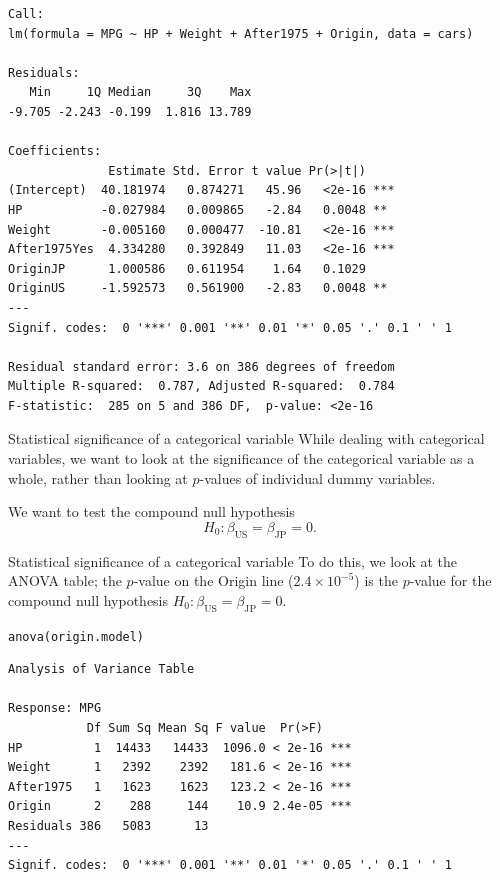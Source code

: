 \documentclass{beamer}\usepackage[]{graphicx}\usepackage[]{color}
\makeatletter
\newcommand{\hlstd}[1]{\textcolor[rgb]{1,0.894,0.769}{#1}}%
\newcommand{\hlkwd}[1]{\textcolor[rgb]{1,0.78,0.769}{#1}}%
\newenvironment{kframe}{%
 \def\at@end@of@kframe{}%
 \ifinner\ifhmode%
  \def\at@end@of@kframe{\end{minipage}}%
  \begin{minipage}{\columnwidth}%
 \fi\fi%
 \def\FrameCommand##1{\hskip\@totalleftmargin \hskip-\fboxsep
 \colorbox{shadecolor}{##1}\hskip-\fboxsep
     \hskip-\linewidth \hskip-\@totalleftmargin \hskip\columnwidth}%
 \MakeFramed {\advance\hsize-\width
   \@totalleftmargin\z@ \linewidth\hsize
   \@setminipage}}%
 {\par\unskip\endMakeFramed%
 \at@end@of@kframe}
\newenvironment{knitrout}{}{} %
\makeatother
\begin{document}
\begin{darkframes}
\begin{frame}[fragile]
\begin{knitrout}
\begin{kframe}
\begin{verbatim}
Call:
lm(formula = MPG ~ HP + Weight + After1975 + Origin, data = cars)

Residuals:
   Min     1Q Median     3Q    Max 
-9.705 -2.243 -0.199  1.816 13.789 

Coefficients:
              Estimate Std. Error t value Pr(>|t|)    
(Intercept)  40.181974   0.874271   45.96   <2e-16 ***
HP           -0.027984   0.009865   -2.84   0.0048 ** 
Weight       -0.005160   0.000477  -10.81   <2e-16 ***
After1975Yes  4.334280   0.392849   11.03   <2e-16 ***
OriginJP      1.000586   0.611954    1.64   0.1029    
OriginUS     -1.592573   0.561900   -2.83   0.0048 ** 
---
Signif. codes:  0 '***' 0.001 '**' 0.01 '*' 0.05 '.' 0.1 ' ' 1

Residual standard error: 3.6 on 386 degrees of freedom
Multiple R-squared:  0.787,	Adjusted R-squared:  0.784 
F-statistic:  285 on 5 and 386 DF,  p-value: <2e-16
\end{verbatim}
\end{kframe}
\end{knitrout}
    \end{frame}

    \begin{frame}[fragile]{Statistical significance of a categorical variable}
      While dealing with categorical variables, we want to look at the significance of the categorical variable as a whole, rather than looking at $p$-values of individual dummy variables.

      \bigskip\pause

      We want to test the \alert{compound null hypothesis}
      \[
        H_0 : \beta_{\text{US}} = \beta_{\text{JP}} = 0.
      \]
    \end{frame}

    \begin{frame}[fragile]{Statistical significance of a categorical variable}
      To do this, we look at the ANOVA table; the $p$-value on the Origin line ($2.4 \times 10^{-5}$) is the $p$-value for the compound null hypothesis $H_0 : \beta_{\text{US}} = \beta_{\text{JP}} = 0$.
      \fontsm
\begin{knitrout}
\begin{kframe}
\begin{alltt}
\hlkwd{anova}\hlstd{(origin.model)}
\end{alltt}
\begin{verbatim}
Analysis of Variance Table

Response: MPG
           Df Sum Sq Mean Sq F value  Pr(>F)    
HP          1  14433   14433  1096.0 < 2e-16 ***
Weight      1   2392    2392   181.6 < 2e-16 ***
After1975   1   1623    1623   123.2 < 2e-16 ***
Origin      2    288     144    10.9 2.4e-05 ***
Residuals 386   5083      13                    
---
Signif. codes:  0 '***' 0.001 '**' 0.01 '*' 0.05 '.' 0.1 ' ' 1
\end{verbatim}
\end{kframe}
\end{knitrout}
    \end{frame}


\end{darkframes}
\end{document}
